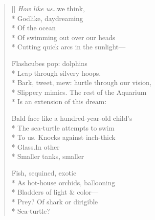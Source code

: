 \label{ch:dolphins}
\settowidth{\versewidth}{Bark, tweet, mew: hurtle through our vision,}
\begin{verse}[\versewidth]
\textit{How like us}\ldots we think,\\*
Godlike, daydreaming\\*
Of the ocean\\*
Of swimming out over our heads\\*
Cutting quick arcs in the sunlight---

Flashcubes pop: dolphins\\*
Leap through silvery hoops,\\*
Bark, tweet, mew: hurtle through our vision,\\*
Slippery mimics. The rest of the Aquarium\\*
Is an extension of this dream:

Bald face like a hundred-year-old child's\\*
The sea-turtle attempts to swim\\*
To us. Knocks against inch-thick\\*
Glass.\qquad In other\\*
Smaller tanks, smaller

Fish, sequined, exotic\\*
As hot-house orchids, ballooning\\*
Bladders of light \& color---\\*
Prey? Of shark or dirigible\\*
Sea-turtle?
\end{verse}
